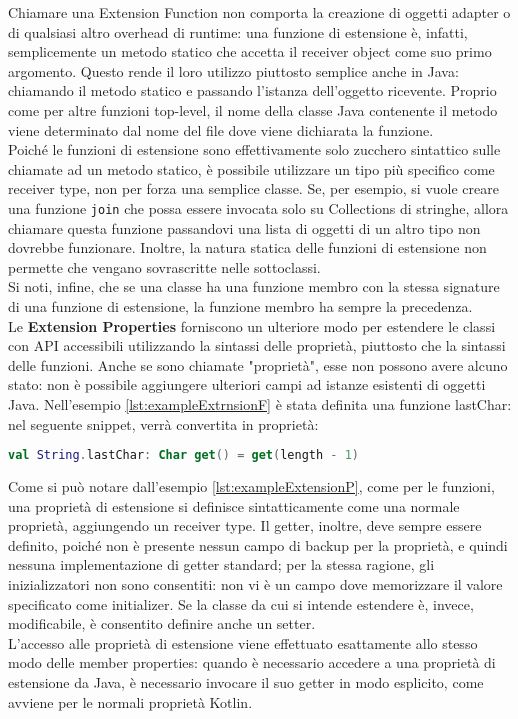 Chiamare una Extension Function non comporta la creazione di oggetti adapter o di qualsiasi altro overhead di runtime: una funzione di estensione è, infatti, semplicemente un metodo statico che accetta il receiver object come suo primo argomento. Questo rende il loro utilizzo piuttosto semplice anche in Java: chiamando il metodo statico e passando l'istanza dell'oggetto ricevente. Proprio come per altre funzioni top-level, il nome della classe Java contenente il metodo viene determinato dal nome del file dove viene dichiarata la funzione.\\
Poiché le funzioni di estensione sono effettivamente solo zucchero sintattico sulle chiamate ad un metodo statico, è possibile utilizzare un tipo più specifico come receiver type, non per forza una semplice classe. Se, per esempio, si vuole creare una funzione \texttt{join} che possa essere invocata solo su Collections di stringhe, allora chiamare questa funzione passandovi una lista di oggetti di un altro tipo non dovrebbe funzionare. Inoltre, la natura statica delle funzioni di estensione non permette che vengano sovrascritte nelle sottoclassi.\\
Si noti, infine, che se una classe ha una funzione membro con la stessa signature di una funzione di estensione, la funzione membro ha sempre la precedenza.\\

Le {\bfseries Extension Properties} forniscono un ulteriore modo per estendere le classi con API accessibili utilizzando la sintassi delle proprietà, piuttosto che la sintassi delle funzioni. Anche se sono chiamate "proprietà", esse non possono avere alcuno stato: non è possibile aggiungere ulteriori campi ad istanze esistenti di oggetti Java. Nell'esempio \ref{lst:exampleExtrnsionF} è stata definita una funzione lastChar: nel seguente snippet, verrà convertita in proprietà:\\

\begin{lstlisting}[caption={Definizione di una Extension Property}, captionpos=b, label={lst:exampleExtensionP}, language=Kotlin]
val String.lastChar: Char get() = get(length - 1)
\end{lstlisting}

Come si può notare dall'esempio \ref{lst:exampleExtensionP}, come per le funzioni, una proprietà di estensione si definisce sintatticamente come una normale proprietà, aggiungendo un receiver type. Il getter, inoltre, deve sempre essere definito, poiché non è presente nessun campo di backup per la proprietà, e quindi nessuna implementazione di getter standard; per la stessa ragione, gli inizializzatori non sono consentiti: non vi è un campo dove memorizzare il valore specificato come initializer. Se la classe da cui si intende estendere è, invece, modificabile, è consentito definire anche un setter.\\
L'accesso alle proprietà di estensione viene effettuato esattamente allo stesso modo delle member properties: quando è necessario accedere a una proprietà di estensione da Java, è necessario invocare il suo getter in modo esplicito, come avviene per le normali proprietà Kotlin.\\

